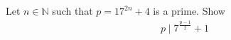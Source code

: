 Let $n \in \mathbb{N}$ such that $p=17^{2n}+4$ is a prime. Show
\begin{align*} p \mid 7^{\tfrac{p-1}{2}} +1 \end{align*}